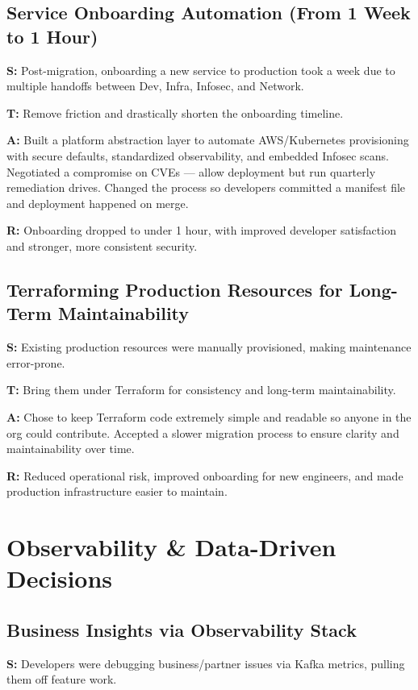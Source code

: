 \documentclass[11pt]{article}
\begin{document}
\subsection{Service Onboarding Automation (From 1 Week to 1 Hour)}
\textbf{S:} Post-migration, onboarding a new service to production took a week due to multiple handoffs between Dev, Infra, Infosec, and Network.

\textbf{T:} Remove friction and drastically shorten the onboarding timeline.

\textbf{A:} Built a platform abstraction layer to automate AWS/Kubernetes provisioning with secure defaults, standardized observability, and embedded Infosec scans. Negotiated a compromise on CVEs — allow deployment but run quarterly remediation drives. Changed the process so developers committed a manifest file and deployment happened on merge.

\textbf{R:} Onboarding dropped to under 1 hour, with improved developer satisfaction and stronger, more consistent security.

\subsection{Terraforming Production Resources for Long-Term Maintainability}
\textbf{S:} Existing production resources were manually provisioned, making maintenance error-prone.

\textbf{T:} Bring them under Terraform for consistency and long-term maintainability.

\textbf{A:} Chose to keep Terraform code extremely simple and readable so anyone in the org could contribute. Accepted a slower migration process to ensure clarity and maintainability over time.

\textbf{R:} Reduced operational risk, improved onboarding for new engineers, and made production infrastructure easier to maintain.

\section{Observability \& Data-Driven Decisions}

\subsection{Business Insights via Observability Stack}
\textbf{S:} Developers were debugging business/partner issues via Kafka metrics, pulling them off feature work.
\end{document}
